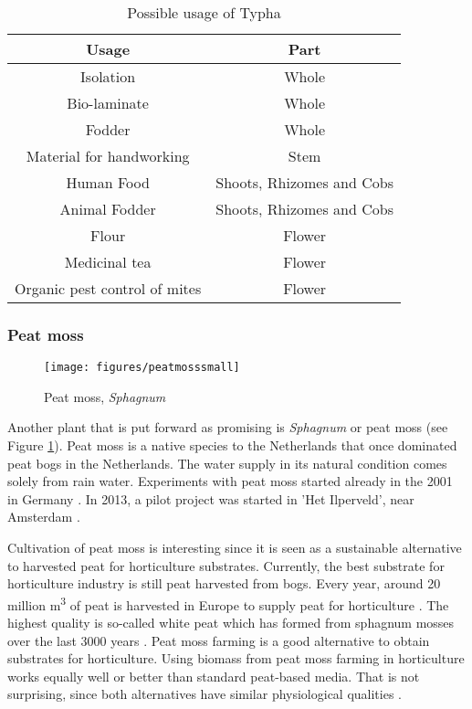 \documentclass[a4paper,12pt]{scrbook}
\begin{document}
\begin{table}
\centering
\caption{Possible usage of Typha}
\begin{tabular}{|c|c|}
\hline 
\textbf{Usage} & \textbf{Part} \\ 
\hline 
Isolation & Whole \\ 
\hline 
Bio-laminate & Whole \\ 
\hline 
Fodder & Whole \\ 
\hline 
Material for handworking & Stem \\ 
\hline 
Human Food & Shoots, Rhizomes and Cobs \\ 
\hline 
Animal Fodder & Shoots, Rhizomes and Cobs \\ 
\hline 
Flour & Flower \\ 
\hline 
Medicinal tea & Flower \\ 
\hline 
Organic pest control of mites & Flower \\ 
\hline 
\end{tabular} 
\label{tab:typha}
\end{table}

\subsubsection{Peat moss}

\begin{figure}
    \centering
    \texttt{[image: figures/peatmosssmall]} 
    \caption{Peat moss, \textit{Sphagnum}}
    \label{fig:peatmoss}
\end{figure}

Another plant that is put forward as promising is \textit{Sphagnum} or peat moss (see Figure \ref{fig:peatmoss}). Peat moss is a native species to the Netherlands that once dominated peat bogs in the Netherlands. The water supply in its natural condition comes solely from rain water. Experiments with peat moss started already in the 2001 in Germany \citep{gaudig2014sphagnum}. In 2013, a pilot project was started in 'Het Ilperveld', near Amsterdam \citep{van2013werk}. 

Cultivation of peat moss is interesting since it is seen as a sustainable alternative to harvested peat for horticulture substrates. Currently, the best substrate for horticulture industry is still peat harvested from bogs. Every year, around 20 million m\textsuperscript{3} of peat is harvested in Europe to supply peat for horticulture \citep{altmann2008socio}. The highest quality is so-called white peat which has formed from sphagnum mosses over the last 3000 years \citep{gaudig2014sphagnum}. Peat moss farming is a good alternative to obtain substrates for horticulture. Using biomass from peat moss farming in horticulture works equally well or better than standard peat-based media. That is not surprising, since both alternatives have similar physiological qualities \citep{gaudig2014sphagnum}. 
\end{document}
